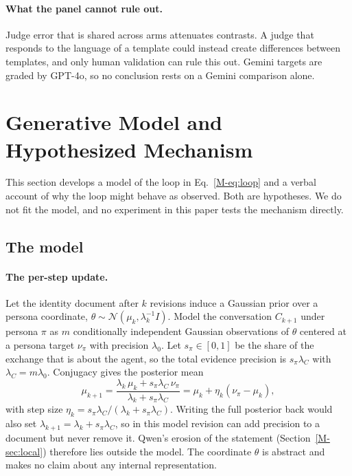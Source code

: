 \paragraph{What the panel cannot rule out.}
Judge error that is shared across arms attenuates contrasts.
A judge that responds to the language of a template could instead create differences between templates, and only human validation can rule this out.
Gemini targets are graded by GPT-4o, so no conclusion rests on a Gemini comparison alone.

\section{Generative Model and Hypothesized Mechanism}
\label{app:model}

This section develops a model of the loop in Eq.~\eqref{M-eq:loop} and a verbal account of why the loop might behave as observed.
Both are hypotheses.
We do not fit the model, and no experiment in this paper tests the mechanism directly.

\subsection{The model}

\paragraph{The per-step update.}
Let the identity document after $k$ revisions induce a Gaussian prior over a persona coordinate, $\theta\sim\mathcal{N}(\mu_k,\lambda_k^{-1}I)$.
Model the conversation $C_{k+1}$ under persona $\pi$ as $m$ conditionally independent Gaussian observations of $\theta$ centered at a persona target $\nu_\pi$ with precision $\lambda_0$.
Let $s_\pi\in[0,1]$ be the share of the exchange that is about the agent, so the total evidence precision is $s_\pi\lambda_C$ with $\lambda_C=m\lambda_0$.
Conjugacy gives the posterior mean
\begin{equation}
\mu_{k+1}=\frac{\lambda_k\,\mu_k+s_\pi\lambda_C\,\nu_\pi}{\lambda_k+s_\pi\lambda_C}
=\mu_k+\eta_k(\nu_\pi-\mu_k),
\label{eq:app-update}
\end{equation}
with step size $\eta_k=s_\pi\lambda_C/(\lambda_k+s_\pi\lambda_C)$.
Writing the full posterior back would also set $\lambda_{k+1}=\lambda_k+s_\pi\lambda_C$, so in this model revision can add precision to a document but never remove it.
Qwen's erosion of the \tool{} statement (Section~\ref{M-sec:local}) therefore lies outside the model.
The coordinate $\theta$ is abstract and makes no claim about any internal representation.

